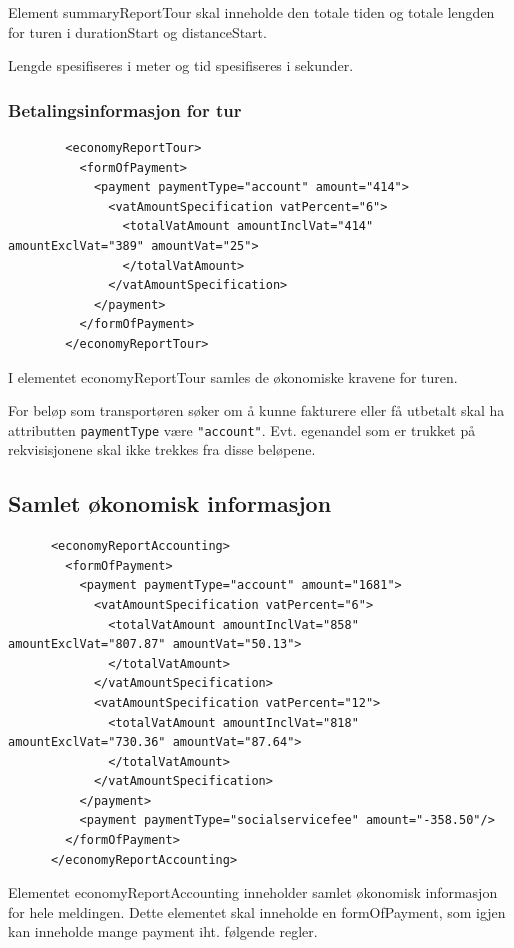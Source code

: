 \documentclass[a4paper,titlepage,norsk,11pt]{article}
\begin{document}
Element summaryReportTour skal inneholde den totale tiden og totale lengden for turen i durationStart og distanceStart.

Lengde spesifiseres i meter og tid spesifiseres i sekunder.

\subsubsection{Betalingsinformasjon for tur}

\begin{lstlisting}
        <economyReportTour>
          <formOfPayment>
            <payment paymentType="account" amount="414">
              <vatAmountSpecification vatPercent="6">
                <totalVatAmount amountInclVat="414" amountExclVat="389" amountVat="25">
                </totalVatAmount>
              </vatAmountSpecification>
            </payment>
          </formOfPayment>
        </economyReportTour>
\end{lstlisting}

I elementet economyReportTour samles de økonomiske kravene for turen.

For beløp som transportøren søker om å kunne fakturere eller få utbetalt skal ha attributten \lstinline{paymentType} være \lstinline{"account"}. Evt. egenandel som er trukket på rekvisisjonene skal ikke trekkes fra disse beløpene.

\subsection{Samlet økonomisk informasjon}

\begin{lstlisting}
      <economyReportAccounting>
        <formOfPayment>
          <payment paymentType="account" amount="1681">
            <vatAmountSpecification vatPercent="6">
              <totalVatAmount amountInclVat="858" amountExclVat="807.87" amountVat="50.13">
              </totalVatAmount>
            </vatAmountSpecification>
            <vatAmountSpecification vatPercent="12">
              <totalVatAmount amountInclVat="818" amountExclVat="730.36" amountVat="87.64">
              </totalVatAmount>
            </vatAmountSpecification>
          </payment>
          <payment paymentType="socialservicefee" amount="-358.50"/>
        </formOfPayment>
      </economyReportAccounting>
\end{lstlisting}

Elementet economyReportAccounting inneholder samlet økonomisk informasjon for hele meldingen. Dette elementet skal inneholde en formOfPayment, som igjen kan inneholde mange payment iht. følgende regler.
\end{document}
